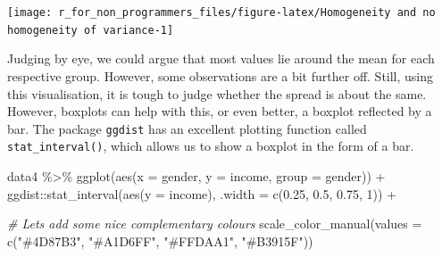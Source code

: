 \documentclass[
]{book}
\newenvironment{Shaded}{\begin{snugshade}}{\end{snugshade}}
\newcommand{\AttributeTok}[1]{\textcolor[rgb]{0.77,0.63,0.00}{#1}}
\newcommand{\CommentTok}[1]{\textcolor[rgb]{0.56,0.35,0.01}{\textit{#1}}}
\newcommand{\DecValTok}[1]{\textcolor[rgb]{0.00,0.00,0.81}{#1}}
\newcommand{\FloatTok}[1]{\textcolor[rgb]{0.00,0.00,0.81}{#1}}
\newcommand{\FunctionTok}[1]{\textcolor[rgb]{0.00,0.00,0.00}{#1}}
\newcommand{\NormalTok}[1]{#1}
\newcommand{\SpecialCharTok}[1]{\textcolor[rgb]{0.00,0.00,0.00}{#1}}
\newcommand{\StringTok}[1]{\textcolor[rgb]{0.31,0.60,0.02}{#1}}
\begin{document}
\begin{Shaded}
\end{Shaded}

\begin{center}\texttt{[image: r\_for\_non\_programmers\_files/figure-latex/Homogeneity and no homogeneity of variance-1]} \end{center}

Judging by eye, we could argue that most values lie around the mean for each respective group. However, some observations are a bit further off. Still, using this visualisation, it is tough to judge whether the spread is about the same. However, boxplots can help with this, or even better, a boxplot reflected by a bar. The package \texttt{ggdist} has an excellent plotting function called \texttt{stat\_interval()}, which allows us to show a boxplot in the form of a bar.

\begin{Shaded}
\begin{Highlighting}[]
\NormalTok{data4 }\SpecialCharTok{\%\textgreater{}\%}
  \FunctionTok{ggplot}\NormalTok{(}\FunctionTok{aes}\NormalTok{(}\AttributeTok{x =}\NormalTok{ gender, }\AttributeTok{y =}\NormalTok{ income, }\AttributeTok{group =}\NormalTok{ gender)) }\SpecialCharTok{+}
\NormalTok{  ggdist}\SpecialCharTok{::}\FunctionTok{stat\_interval}\NormalTok{(}\FunctionTok{aes}\NormalTok{(}\AttributeTok{y =}\NormalTok{ income),}
                        \AttributeTok{.width =} \FunctionTok{c}\NormalTok{(}\FloatTok{0.25}\NormalTok{, }\FloatTok{0.5}\NormalTok{, }\FloatTok{0.75}\NormalTok{, }\DecValTok{1}\NormalTok{)) }\SpecialCharTok{+}

  \CommentTok{\# Let\textquotesingle{}s add some nice complementary colours}
  \FunctionTok{scale\_color\_manual}\NormalTok{(}\AttributeTok{values =} \FunctionTok{c}\NormalTok{(}\StringTok{"\#4D87B3"}\NormalTok{, }\StringTok{"\#A1D6FF"}\NormalTok{, }\StringTok{"\#FFDAA1"}\NormalTok{, }\StringTok{"\#B3915F"}\NormalTok{))}
\end{Highlighting}
\end{Shaded}
\end{document}
